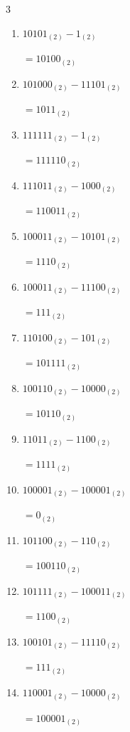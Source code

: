 \begin{multicols}{3}
\begin{enumerate}
\columnbreak %

  \item $10101_{(2)} - 1_{(2)}$

        $=10100_{(2)}$

  \item $101000_{(2)} - 11101_{(2)}$

        $=1011_{(2)}$

  \item $111111_{(2)} - 1_{(2)}$

        $=111110_{(2)}$

  \item $111011_{(2)} - 1000_{(2)}$

        $=110011_{(2)}$

  \item $100011_{(2)} - 10101_{(2)}$

        $=1110_{(2)}$

  \item $100011_{(2)} - 11100_{(2)}$

        $=111_{(2)}$

  \item $110100_{(2)} - 101_{(2)}$

        $=101111_{(2)}$

  \item $100110_{(2)} - 10000_{(2)}$

        $=10110_{(2)}$

  \item $11011_{(2)} - 1100_{(2)}$

        $=1111_{(2)}$

  \item $100001_{(2)} - 100001_{(2)}$

        $=0_{(2)}$

\columnbreak %

  \item $101100_{(2)} - 110_{(2)}$

        $=100110_{(2)}$

  \item $101111_{(2)} - 100011_{(2)}$

        $=1100_{(2)}$

  \item $100101_{(2)} - 11110_{(2)}$

        $=111_{(2)}$

  \item $110001_{(2)} - 10000_{(2)}$

        $=100001_{(2)}$


\end{enumerate}
\end{multicols}
